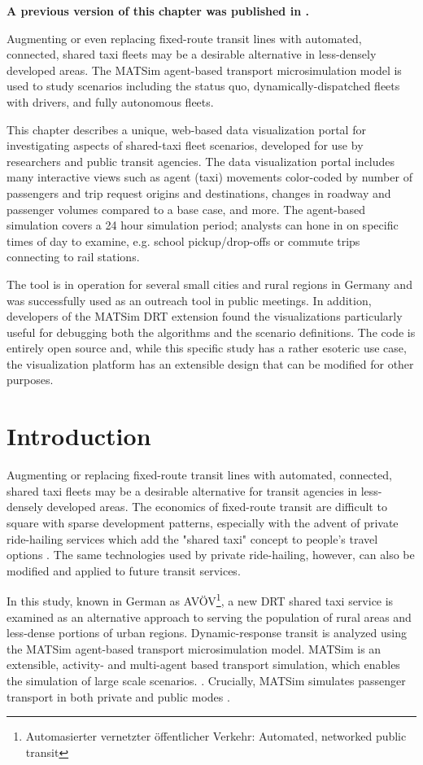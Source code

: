 \textbf{A previous version of this chapter was published in \citet{CharltonLeichKaddoura2021avoev}.}

Augmenting or even replacing fixed-route transit lines with automated, connected, shared taxi fleets may be a desirable alternative in less-densely developed areas. The MATSim agent-based transport microsimulation model is used to study scenarios including the status quo, dynamically-dispatched fleets with drivers, and fully autonomous fleets.

This chapter describes a unique, web-based data visualization portal for investigating aspects of shared-taxi fleet scenarios, developed for use by researchers and public transit agencies. The data visualization portal includes many interactive views such as agent (taxi) movements color-coded by number of passengers and trip request origins and destinations, changes in roadway and passenger volumes compared to a base case, and more. The agent-based simulation covers a 24 hour simulation period; analysts can hone in on specific times of day to examine, e.g. school pickup/drop-offs or commute trips connecting to rail stations.

The tool is in operation for several small cities and rural regions in Germany and was successfully used as an outreach tool in public meetings. In addition, developers of the MATSim DRT extension found the visualizations particularly useful for debugging both the algorithms and the scenario definitions. The code is entirely open source and, while this specific study has a rather esoteric use case, the visualization platform has an extensible design that can be modified for other purposes.

\section{Introduction}
\label{avov-introduction}

Augmenting or replacing fixed-route transit lines with automated, connected, shared taxi fleets may be a desirable alternative for transit agencies in less-densely developed areas. The economics of fixed-route transit are difficult to square with sparse development patterns, especially with the advent of private ride-hailing services which add the "shared taxi" concept to people's travel options \cite{Hough2018}. The same technologies used by private ride-hailing, however, can also be modified and applied to future transit services.

In this study, known in German as AVÖV\footnote{Automasierter vernetzter öffentlicher Verkehr: Automated, networked public transit}, a new \gls{DRT} shared taxi service is examined as an alternative approach to serving the population of rural areas and less-dense portions of urban regions. Dynamic-response transit is analyzed using the \gls{MATSim} agent-based transport microsimulation model. MATSim is an extensible, activity- and multi-agent based transport simulation, which enables the simulation of large scale scenarios. \cite{MATSimBook}. Crucially, MATSim simulates passenger transport in both private and public modes \cite{ZiemkeEtAl2019OpenBerlinScenario}.

